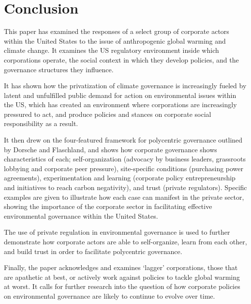 \section{Conclusion} %

This paper has examined the responses of a select group of corporate
actors within the United States to the issue of anthropogenic global
warming and climate change. It examines the US regulatory environment
inside which corporations operate, the social context in which they
develop policies, and the governance structures they influence.

It has shown how the privatization of climate governance is
increasingly fueled by latent and unfulfilled public demand for action
on environmental issues within the US, which has created an
environment where corporations are increasingly pressured to act, and
produce policies and stances on corporate social responsibility as a
result.

It then drew on the four-featured framework for polycentric governance
outlined by Dorsche and Flaschland, and shows how corporate governance
shows characteristics of each; self-organization (advocacy by business
leaders, grassroots lobbying and corporate peer pressure),
site-specific conditions (purchasing power agreements),
experimentation and learning (corporate policy entrepreneurship and
initiatives to reach carbon negativity), and trust (private
regulators). Specific examples are given to illustrate how each case
can manifest in the private sector, showing the importance of the
corporate sector in facilitating effective environmental governance
within the United States.

The use of private regulation in environmental governance is used to
further demonstrate how corporate actors are able to self-organize,
learn from each other, and build trust in order to facilitate
polycentric governance.

Finally, the paper acknowledges and examines `lagger' corporations,
those that are apathetic at best, or actively work against policies to
tackle global warming at worst. It calls for further research into the
question of how corporate policies on environmental governance are
likely to continue to evolve over time.
